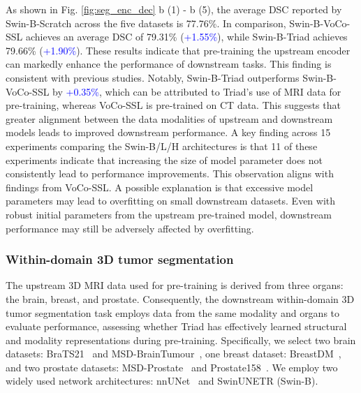 As shown in Fig. \ref{fig:seg_enc_dec} b (1) - b (5), the average DSC reported by Swin-B-Scratch across the five datasets is 77.76\%. In comparison, Swin-B-VoCo-SSL achieves an average DSC of 79.31\% (\textcolor{blue}{+1.55\%}), while Swin-B-Triad achieves 79.66\% (\textcolor{blue}{+1.90\%}).
These results indicate that pre-training the upstream encoder can markedly enhance the performance of downstream tasks. This finding is consistent with previous studies\citep{wu2024voco,amadou2024echoapex}. Notably, Swin-B-Triad outperforms Swin-B-VoCo-SSL by \textcolor{blue}{+0.35\%}, which can be attributed to Triad's use of MRI data for pre-training, whereas VoCo-SSL is pre-trained on CT data. This suggests that greater alignment between the data modalities of upstream and downstream models leads to improved downstream performance.
A key finding across 15 experiments comparing the Swin-B/L/H architectures is that 11 of these experiments indicate that increasing the size of model parameter does not consistently lead to performance improvements. This observation aligns with findings from VoCo-SSL\citep{wu2024voco}. A possible explanation is that excessive model parameters may lead to overfitting on small downstream datasets. Even with robust initial parameters from the upstream pre-trained model, downstream performance may still be adversely affected by overfitting.



\subsubsection{Within-domain 3D tumor segmentation}

The upstream 3D MRI data used for pre-training is derived from three organs: the brain, breast, and prostate. Consequently, the downstream within-domain 3D tumor segmentation task employs data from the same modality and organs to evaluate performance, assessing whether Triad has effectively learned structural and modality representations during pre-training.
Specifically, we select two brain datasets: BraTS21~\citep{baid2021rsna} and MSD-BrainTumour~\citep{antonelli2022medical}, one breast dataset: BreastDM~\citep{zhao2023breastdm}, and two prostate datasets: MSD-Prostate~\citep{antonelli2022medical} and Prostate158~\citep{adams2022prostate158}.
We employ two widely used network architectures: nnUNet~\cite{isensee2021nnu} and SwinUNETR (Swin-B).

